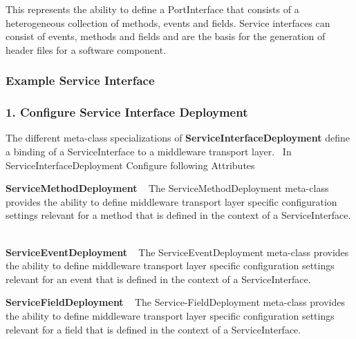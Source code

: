 This represents the ability to define a Port\+Interface that consists of a heterogeneous collection of methods, events and fields. Service interfaces can consist of events, methods and fields and are the basis for the generation of header files for a software component.  \subsubsection*{Example Service Interface}



\subsubsection*{1. Configure Service Interface Deployment}

The different meta-\/class specializations of {\bfseries Service\+Interface\+Deployment} define a binding of a Service\+Interface to a middleware transport layer.~\newline
 In Service\+Interface\+Deployment Configure following Attributes ~\newline

\begin{DoxyItemize}
\item {\bfseries Service\+Method\+Deployment} ~\newline
 The Service\+Method\+Deployment meta-\/class provides the ability to define middleware transport layer specific configuration settings relevant for a method that is defined in the context of a Service\+Interface. ~\newline

\item {\bfseries Service\+Event\+Deployment} ~\newline
 The Service\+Event\+Deployment meta-\/class provides the ability to define middleware transport layer specific configuration settings relevant for an event that is defined in the context of a Service\+Interface. ~\newline

\item {\bfseries Service\+Field\+Deployment} ~\newline
 The Service-\/\+Field\+Deployment meta-\/class provides the ability to define middleware transport layer specific configuration settings relevant for a field that is defined in the context of a Service\+Interface. ~\newline

\end{DoxyItemize}



